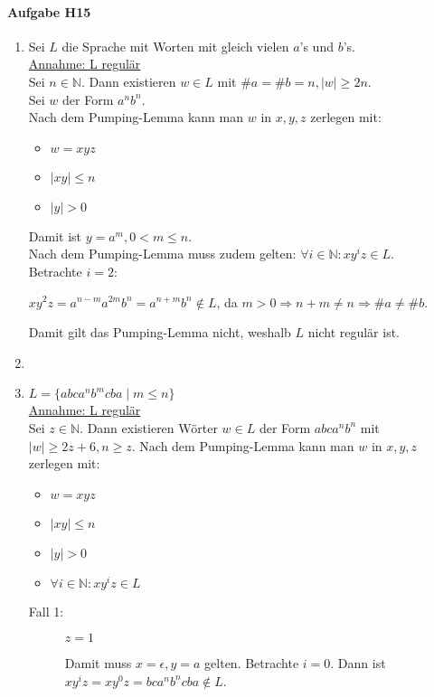 \documentclass[11pt]{article}
\begin{document}
\paragraph{Aufgabe H15}
\begin{enumerate}[label=\alph*)]
\item Sei $L$ die Sprache mit Worten mit gleich vielen $a$'s und $b$'s.\\
\underline{Annahme: L regulär}\\
Sei $n\in\mathbb{N}$. Dann existieren $w\in L$ mit $\# a = \# b = n, \vert w \vert \geq 2n$.\\
Sei $w$ der Form $a^{n}b^{n}$.\\
Nach dem Pumping-Lemma kann man $w$ in $x,y,z$ zerlegen mit:
\begin{itemize}
\item $w=xyz$
\item $\vert xy \vert \leq n$
\item $\vert y \vert > 0$
\end{itemize}
Damit ist $y=a^{m}, 0<m\leq n$.\\
Nach dem Pumping-Lemma muss zudem gelten: $\forall i\in\mathbb{N}: xy^{i}z \in L$.\\
Betrachte $i=2$:
\begin{center}
$xy^2z=a^{n-m}a^{2m}b^{n}=a^{n+m}b^{n} \not\in L$, da $m>0 \Rightarrow n+m \neq n \Rightarrow \# a \neq \# b$.
\end{center}
Damit gilt das Pumping-Lemma nicht, weshalb $L$ nicht regulär ist.
\item
\item $L=\{abca^nb^mcba\mid m\leq n\}$\\
\underline{Annahme: L regulär}\\
Sei $z\in\mathbb{N}$. Dann existieren Wörter $w\in L$ der Form $abca^nb^n$ mit $\vert w \vert \geq 2z+6, n \geq z$.
Nach dem Pumping-Lemma kann man $w$ in $x,y,z$ zerlegen mit:
\begin{itemize}
\item $w=xyz$
\item $\vert xy \vert \leq n$
\item $\vert y \vert > 0$
\item $\forall i\in\mathbb{N}: xy^{i}z \in L$
\end{itemize}
\begin{description}
\item[Fall 1:] $z=1$\par\nobreak
Damit muss $x=\epsilon, y=a$ gelten. Betrachte $i=0$. Dann ist $xy^iz=xy^0z=bca^nb^ncba\not\in L$.

\end{description}
\end{enumerate}
\end{document}
